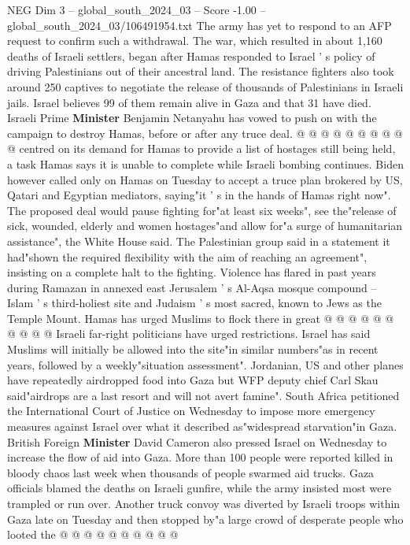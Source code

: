 \begin{textsample}{NEG Dim 3 – global\_south\_2024\_03 – Score -1.00 – global\_south\_2024\_03/106491954.txt}
The army has yet to respond to an AFP request to confirm such a withdrawal.
The war, which resulted in about 1,160 deaths of Israeli settlers, began after Hamas responded to Israel ' s policy of driving Palestinians out of their ancestral land.
The resistance fighters also took around 250 captives to negotiate the release of thousands of Palestinians in Israeli jails.
Israel believes 99 of them remain alive in Gaza and that 31 have died.
Israeli Prime \textbf{Minister} Benjamin Netanyahu has vowed to push on with the campaign to destroy Hamas, before or after any truce deal. @ @ @ @ @ @ @ @ @ @ centred on its demand for Hamas to provide a list of hostages still being held, a task Hamas says it is unable to complete while Israeli bombing continues.
Biden however called only on Hamas on Tuesday to accept a truce plan brokered by US, Qatari and Egyptian mediators, saying"it ' s in the hands of Hamas right now".
The proposed deal would pause fighting for"at least six weeks", see the"release of sick, wounded, elderly and women hostages"and allow for"a surge of humanitarian assistance", the White House said.
The Palestinian group said in a statement it had"shown the required flexibility with the aim of reaching an agreement", insisting on a complete halt to the fighting.
Violence has flared in past years during Ramazan in annexed east Jerusalem ' s Al-Aqsa mosque compound -- Islam ' s third-holiest site and Judaism ' s most sacred, known to Jews as the Temple Mount.
Hamas has urged Muslims to flock there in great @ @ @ @ @ @ @ @ @ @ Israeli far-right politicians have urged restrictions.
Israel has said Muslims will initially be allowed into the site"in similar numbers"as in recent years, followed by a weekly"situation assessment".
Jordanian, US and other planes have repeatedly airdropped food into Gaza but WFP deputy chief Carl Skau said"airdrops are a last resort and will not avert famine".
South Africa petitioned the International Court of Justice on Wednesday to impose more emergency measures against Israel over what it described as"widespread starvation"in Gaza.
British Foreign \textbf{Minister} David Cameron also pressed Israel on Wednesday to increase the flow of aid into Gaza.
More than 100 people were reported killed in bloody chaos last week when thousands of people swarmed aid trucks.
Gaza officials blamed the deaths on Israeli gunfire, while the army insisted most were trampled or run over.
Another truck convoy was diverted by Israeli troops within Gaza late on Tuesday and then stopped by"a large crowd of desperate people who looted the @ @ @ @ @ @ @ @ @ @

\end{textsample}
